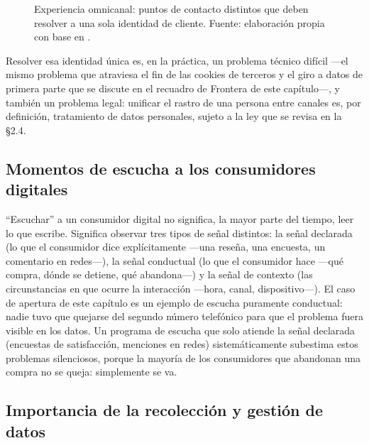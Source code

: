 \begin{figure}[htbp]
  \centering
  
  \caption{Experiencia omnicanal: puntos de contacto distintos que deben
  resolver a una sola identidad de cliente. Fuente: elaboración propia con
  base en \parencite{verhoef2015}.}
  \label{fig:cap03-omnicanal}
\end{figure}

Resolver esa identidad única es, en la práctica, un problema técnico difícil
—el mismo problema que atraviesa el fin de las cookies de terceros y el giro
a datos de primera parte que se discute en el recuadro de Frontera de este
capítulo—, y también un problema legal: unificar el rastro de una persona
entre canales es, por definición, tratamiento de datos personales, sujeto a
la ley que se revisa en la §2.4.

\subsection{Momentos de escucha a los consumidores digitales}

\enquote{Escuchar} a un consumidor digital no significa, la mayor parte del
tiempo, leer lo que escribe. Significa observar tres tipos de señal
distintos: la señal declarada (lo que el consumidor dice explícitamente —una
reseña, una encuesta, un comentario en redes—), la señal conductual (lo que
el consumidor hace —qué compra, dónde se detiene, qué abandona—) y la señal
de contexto (las circunstancias en que ocurre la interacción —hora, canal,
dispositivo—). El caso de apertura de este capítulo es un ejemplo de escucha
puramente conductual: nadie tuvo que quejarse del segundo número telefónico
para que el problema fuera visible en los datos. Un programa de escucha que
solo atiende la señal declarada (encuestas de satisfacción, menciones en
redes) sistemáticamente subestima estos problemas silenciosos, porque la
mayoría de los consumidores que abandonan una compra no se queja: simplemente
se va.

\subsection{Importancia de la recolección y gestión de datos}

